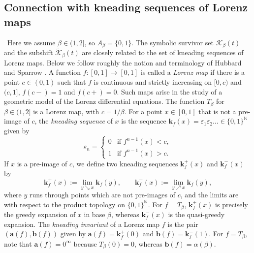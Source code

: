 \documentclass[11pt]{amsart}
\theoremstyle{definition}
\theoremstyle{remark}
\numberwithin{equation}{section}
\newcommand{\N}{\ensuremath{\mathbb{N}}}
\newcommand{\Kt}{\widetilde{\mathcal{K}}}
\renewcommand{\a}{ {\mathbf{a}}}
\renewcommand{\b}{ {\mathbf{b}}}
\newcommand{\ep}{\varepsilon}
\newcommand{\f}{\infty}
\newcommand{\al}{\alpha}
\renewcommand{\a}{ \mathbf{a}}
\begin{document}
\subsection{Connection with kneading sequences of Lorenz maps} \label{subsec:Lorenz}
\ 
{Here we assume $\beta\in(1,2]$, so $A_\beta=\{0,1\}$.}
The symbolic survivor set $\mathcal{K}_\beta(t)$ and the subshift $\Kt_\beta(t)$ are closely related to the set of kneading sequences of Lorenz maps. Below we follow roughly the notion and terminology of Hubbard and Sparrow \cite{Hubbard-Sparrow-1990}. A function $f:[0,1]\to[0,1]$ is called a {\em Lorenz map} if there is a point $c\in(0,1)$ such that $f$ is continuous and strictly increasing on $[0,c)$ and $(c,1]$, $f(c-)=1$ and $f(c+)=0$. Such maps arise in the study of a geometric model of the Lorenz differential equations. The function $T_\beta$ for $\beta\in(1,2]$ is a Lorenz map, with $c=1/\beta$. For a point $x\in[0,1]$ that is not a pre-image of $c$, the {\em kneading sequence} of $x$ is the sequence $\mathbf{k}_f(x)=\ep_1\ep_2\dots\in\{0,1\}^\N$ given by
\[
\ep_n=\begin{cases}
0 & \mbox{if $f^{n-1}(x)<c$},\\
1 & \mbox{if $f^{n-1}(x)>c$}.
\end{cases}
\]
If $x$ is a pre-image of $c$, we define two kneading sequences $\mathbf{k}_f^+(x)$ and $\mathbf{k}_f^-(x)$ by
\[
\mathbf{k}_f^+(x):=\lim_{y\searrow x} \mathbf{k}_f(y), \qquad \mathbf{k}_f^-(x):=\lim_{y\nearrow x} \mathbf{k}_f(y),
\]
where $y$ runs through points which are not pre-images of $c$, and the limits are with respect to the product topology on $\{0,1\}^\N$. For $f=T_\beta$, $\mathbf{k}_f^+(x)$ is precisely the greedy expansion of $x$ in base $\beta$, whereas $\mathbf{k}_f^-(x)$ is the quasi-greedy expansion. The {\em kneading invariant} of a Lorenz map $f$ is the pair $(\a(f),\b(f))$ given by $\a(f)=\mathbf{k}_f^+(0)$ and $\b(f)=\mathbf{k}_f^-(1)$. For $f=T_\beta$, note that $\a(f)=0^\f$ because $T_\beta(0)=0$, whereas $\b(f)=\al(\beta)$.
\end{document}
